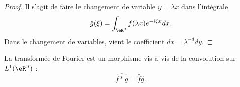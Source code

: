 \begin{proof}
    Il s'agit de faire le changement de variable \( y=\lambda x\) dans l'intégrale
    \begin{equation}
        \hat g(\xi)=\int_{\eR^d}f(\lambda x) e^{-i\xi x}dx.
    \end{equation}
    Dans le changement de variables, vient le coefficient \( dx=\lambda^{-d}dy\).
\end{proof}

\begin{proposition}     \label{PropfqvLOl}
    La transformée de Fourier est un morphisme vis-à-vis de la convolution sur \( L^1(\eR^n)\) :
    \begin{equation}
        \widehat{f*g}=\hat f\hat g.
    \end{equation}
\end{proposition}

